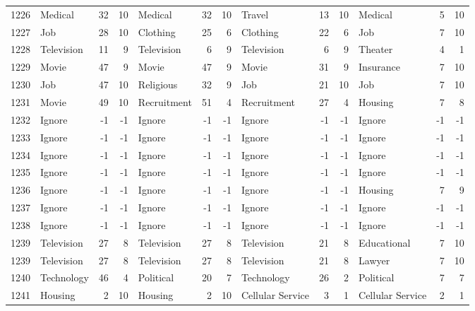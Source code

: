 \begin{figure}[htbp]
\begin{tabular}{rlrrlrrlrrlrr}
    1226  & Medical & 32    & 10    & Medical & 32    & 10    & Travel & 13    & 10    & Medical & 5     & 10 \\
    1227  & Job   & 28    & 10    & Clothing & 25    & 6     & Clothing & 22    & 6     & Job   & 7     & 10 \\
    1228  & Television & 11    & 9     & Television & 6     & 9     & Television & 6     & 9     & Theater & 4     & 1 \\
    1229  & Movie & 47    & 9     & Movie & 47    & 9     & Movie & 31    & 9     & Insurance & 7     & 10 \\
    1230  & Job   & 47    & 10    & Religious & 32    & 9     & Job   & 21    & 10    & Job   & 7     & 10 \\
    1231  & Movie & 49    & 10    & Recruitment & 51    & 4     & Recruitment & 27    & 4     & Housing & 7     & 8 \\
    1232  & Ignore & -1    & -1    & Ignore & -1    & -1    & Ignore & -1    & -1    & Ignore & -1    & -1 \\
    1233  & Ignore & -1    & -1    & Ignore & -1    & -1    & Ignore & -1    & -1    & Ignore & -1    & -1 \\
    1234  & Ignore & -1    & -1    & Ignore & -1    & -1    & Ignore & -1    & -1    & Ignore & -1    & -1 \\
    1235  & Ignore & -1    & -1    & Ignore & -1    & -1    & Ignore & -1    & -1    & Ignore & -1    & -1 \\
    1236  & Ignore & -1    & -1    & Ignore & -1    & -1    & Ignore & -1    & -1    & Housing & 7     & 9 \\
    1237  & Ignore & -1    & -1    & Ignore & -1    & -1    & Ignore & -1    & -1    & Ignore & -1    & -1 \\
    1238  & Ignore & -1    & -1    & Ignore & -1    & -1    & Ignore & -1    & -1    & Ignore & -1    & -1 \\
    1239  & Television & 27    & 8     & Television & 27    & 8     & Television & 21    & 8     & Educational & 7     & 10 \\
    1239  & Television & 27    & 8     & Television & 27    & 8     & Television & 21    & 8     & Lawyer & 7     & 10 \\
    1240  & Technology & 46    & 4     & Political & 20    & 7     & Technology & 26    & 2     & Political & 7     & 7 \\
    1241  & Housing & 2     & 10    & Housing & 2     & 10    & Cellular Service & 3     & 1     & Cellular Service & 2     & 1 \\

\end{tabular}
\end{figure}

